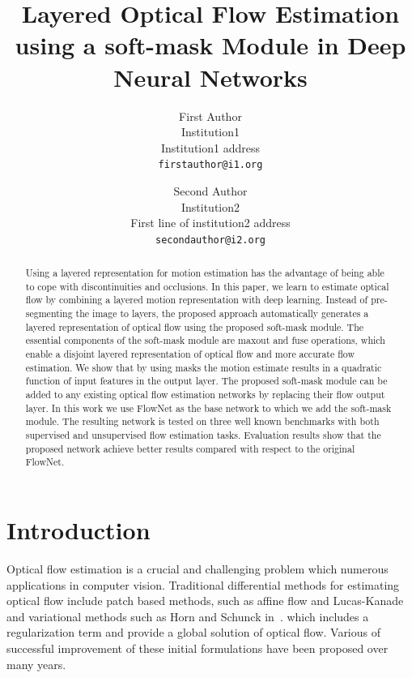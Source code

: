 \documentclass[10pt,twocolumn,letterpaper]{article}
\begin{document}
\title{Layered Optical Flow Estimation using a soft-mask Module in Deep Neural Networks}

\author{First Author\\
Institution1\\
Institution1 address\\
{\tt\small firstauthor@i1.org}
\and
Second Author\\
Institution2\\
First line of institution2 address\\
{\tt\small secondauthor@i2.org}
}

\maketitle

\begin{abstract}
Using a layered representation for motion estimation has the advantage of being able to cope with discontinuities and occlusions. In this paper, we learn to estimate optical flow by combining a layered motion representation with deep learning. Instead of pre-segmenting the image to layers, the proposed approach automatically generates a layered representation of optical flow using the proposed soft-mask module. The essential components of the soft-mask module are maxout and  fuse operations, which enable a disjoint layered representation of optical flow and more accurate flow estimation. We show that by using masks the motion estimate results in a quadratic function of input features in the output layer. The proposed soft-mask module can be added to any existing optical flow estimation networks by replacing their flow output layer. In this work we use FlowNet as the base network to which we add the soft-mask module. The resulting network is tested on three well known benchmarks with both supervised and unsupervised flow estimation tasks. Evaluation results show that the proposed network achieve better results compared with respect to the original FlowNet. 
\end{abstract}

\section{Introduction}
Optical flow estimation is a crucial and challenging problem which numerous applications in computer vision. Traditional differential methods for estimating optical flow include patch based methods, such as affine flow and Lucas-Kanade~\cite{Lucas:1981:IIR:1623264.1623280} and variational methods such as Horn and Schunck in~\cite{horn1981determining}. which includes a regularization term and provide a global solution of optical flow. Various of successful improvement of these initial formulations have been proposed over many years.
\end{document}
